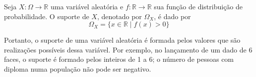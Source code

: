 \begin{def:suporte discreta}
Seja $X: \Omega \to \mathbb{R}$ uma variável aleatória e $f: \mathbb{R} \to \mathbb{R}$ sua
função de distribuição de probabilidade. O suporte de $X$, denotado por $\Omega_X$, é dado
por
\[
	\Omega_X = \{x \in \mathbb{R} \mid f(x) > 0 \}
\]
\end{def:suporte discreta}
Portanto, o suporte de uma variável aleatória é formada pelos valores que são realizações
possíveis dessa variável. Por exemplo, no lançamento de um dado de 6 faces, o suporte
é formado pelos inteiros de 1 a 6; o número de pessoas com diploma numa população não
pode ser negativo.
